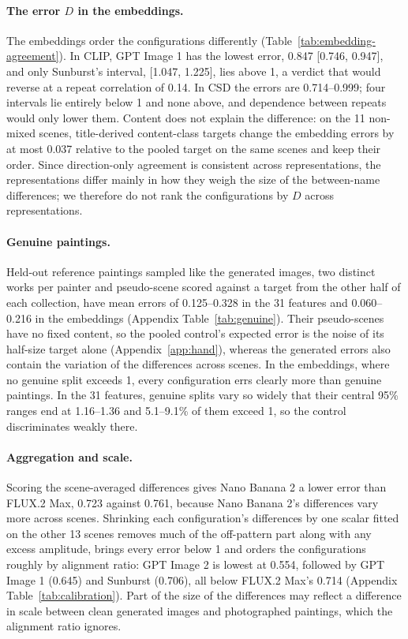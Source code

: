\documentclass[10pt]{article}
\begin{document}


\paragraph{The error $D$ in the embeddings.} The embeddings order the configurations differently
(Table~\ref{tab:embedding-agreement}). In CLIP, GPT Image 1 has the lowest error, 0.847 [0.746,
0.947], and only Sunburst's interval, [1.047, 1.225], lies above 1, a verdict that would reverse at
a repeat correlation of 0.14. In CSD the errors are 0.714--0.999; four intervals lie entirely below
1 and none above, and dependence between repeats would only lower them. Content does not explain
the difference: on the 11 non-mixed scenes, title-derived content-class targets change the
embedding errors by at most 0.037 relative to the pooled target on the same scenes and keep their
order. Since direction-only agreement is consistent across representations, the representations
differ mainly in how they weigh the size of the between-name differences; we therefore do not rank
the configurations by $D$ across representations.

\paragraph{Genuine paintings.} Held-out reference paintings sampled like the generated images, two
distinct works per painter and pseudo-scene scored against a target from the other half of each
collection, have mean errors of 0.125--0.328 in the 31 features and 0.060--0.216 in the embeddings
(Appendix Table~\ref{tab:genuine}). Their pseudo-scenes have no fixed content, so the pooled
control's expected error is the noise of its half-size target alone (Appendix~\ref{app:hand}),
whereas the generated errors also contain the variation of the differences across scenes. In the
embeddings, where no genuine split exceeds 1, every configuration errs clearly more than genuine
paintings. In the 31 features, genuine splits vary so widely that their central 95\% ranges end at
1.16--1.36 and 5.1--9.1\% of them exceed 1, so the control discriminates weakly there.

\paragraph{Aggregation and scale.} Scoring the scene-averaged differences gives Nano Banana 2 a
lower error than FLUX.2 Max, 0.723 against 0.761, because Nano Banana 2's differences vary more
across scenes. Shrinking each configuration's differences by one scalar fitted on the other 13
scenes removes much of the off-pattern part along with any excess amplitude, brings every error
below 1 and orders the configurations roughly by alignment ratio: GPT Image 2 is lowest at 0.554,
followed by GPT Image 1 (0.645) and Sunburst (0.706), all below FLUX.2 Max's 0.714 (Appendix
Table~\ref{tab:calibration}). Part of the size of the differences may reflect a difference in scale
between clean generated images and photographed paintings, which the alignment ratio ignores.
\end{document}
